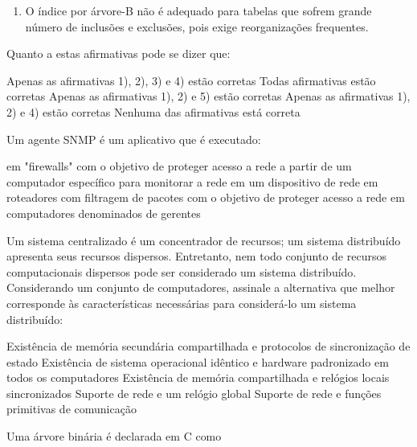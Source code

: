 \documentclass[12pt, addpoints]{exam}
\begin{document}
\begin{questions}
\begin{enumerate}
    \item O índice por árvore-B não é adequado para tabelas que sofrem grande número de inclusões e exclusões, pois exige reorganizações frequentes.

\end{enumerate}





Quanto a estas afirmativas pode se dizer que:
\begin{choices}
\choice Apenas as afirmativas 1), 2), 3) e 4) estão corretas
\choice Todas afirmativas estão corretas
\choice Apenas as afirmativas 1), 2) e 5) estão corretas
\choice Apenas as afirmativas 1), 2) e 4) estão corretas
\choice Nenhuma das afirmativas está correta
\end{choices}

\question

Um agente SNMP é um aplicativo que é executado:
\begin{choices}
\choice em "firewalls" com o objetivo de proteger acesso a rede
\choice a partir de um computador específico para monitorar a rede
\choice em um dispositivo de rede
\choice em roteadores com filtragem de pacotes com o objetivo de proteger acesso a rede
\choice em computadores denominados de gerentes
\end{choices}

\question

Um sistema centralizado é um concentrador de recursos; um sistema distribuído apresenta seus recursos dispersos. Entretanto, nem todo conjunto de recursos computacionais dispersos pode ser considerado um sistema distribuído. Considerando um conjunto de computadores, assinale a alternativa que melhor corresponde às características necessárias para considerá-lo um sistema distribuído:
\begin{choices}
\choice Existência de memória secundária compartilhada e protocolos de sincronização de estado
\choice Existência de sistema operacional idêntico e hardware padronizado em todos os computadores
\choice Existência de memória compartilhada e relógios locais sincronizados 
\choice Suporte de rede e um relógio global
\choice Suporte de rede e funções primitivas de comunicação 
\end{choices}

\question

Uma árvore binária é declarada em C como



\begin{verbatim}


\end{verbatim}
\end{questions}
\end{document}
